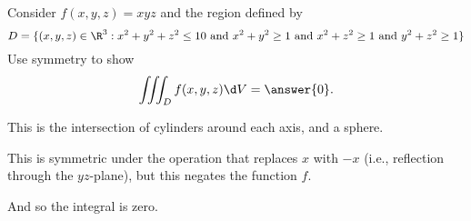 \documentclass{ximera}
\author{Jim Fowler}
\begin{document}
\begin{exercise}
Consider $f(x,y,z) = xyz$ and the region defined by
$$
D = \{ (x,y,z) \in \R^3 : x^2 + y^2 + z^2 \leq 10 \mbox{ and } x^2 + y^2
\geq 1 \mbox{ and } x^2 + z^2 \geq 1 \mbox{ and } y^2 + z^2 \geq 1 \}
$$
Use symmetry to show
\[
  \iiint_D f(x,y,z) \d V = \answer{0}.
\]

\begin{hint}
  This is the intersection of cylinders around each axis, and a sphere.
\end{hint}
\begin{hint}
  This is symmetric under the operation that replaces $x$ with $-x$ (i.e., reflection through the $yz$-plane), but this negates the function $f$.
\end{hint}
\begin{hint}
And so the integral is zero.
\end{hint}
\end{exercise}
\end{document}
